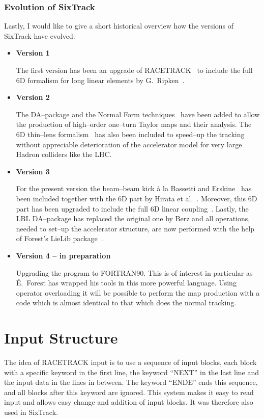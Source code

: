 \documentclass[a4paper,11pt]{report}
\begin{document}
\subsection{Evolution of SixTrack}
Lastly, I would like to give a short historical overview how the versions of SixTrack have evolved.
\begin{itemize}
\item {\bf Version 1}

  The first version has been an upgrade of RACETRACK~\cite{RACETRACK}
  to include the full 6D formalism for long linear elements by
  G.~Ripken~\cite{Ripken85}.
\item {\bf Version 2}

  The DA--package and the Normal Form
  techniques~\cite{Berz89,Forest89} have been added to allow the
  production of high--order one--turn Taylor maps and their
  analysis. The 6D thin--lens formalism~\cite{Ripken95} has also been
  included to speed--up the tracking without appreciable deterioration
  of the accelerator model for very large Hadron colliders like the
  LHC.
\item {\bf Version 3}
  
  For the present version the beam--beam kick \`a la Bassetti and
  Erskine~\cite{BasErs} has been included together with the 6D part by
  Hirata et al.~\cite{Hirata}. Moreover, this 6D part has been
  upgraded to include the full 6D linear coupling~\cite{ripbeam}.
  Lastly, the LBL DA--package has replaced the original one by Berz
  and all operations, needed to set--up the accelerator structure, are
  now performed with the help of Forest's LieLib package~\cite{DALIE}.
\item {\bf Version 4 -- in preparation}
  
  Upgrading the program to FORTRAN90. This is of interest in
  particular as \'E.~Forest has wrapped his tools in this more
  powerful language. Using operator overloading it will be possible to
  perform the map production with a code which is almost identical to
  that which does the normal tracking.
\end{itemize}


\chapter{Input Structure} \label{InpStr}

The idea of RACETRACK input is to use a sequence of input blocks, each
block with a specific keyword in the first line, the keyword ``NEXT''
in the last line and the input data in the lines in between. The
keyword ``ENDE'' ends this sequence, and all blocks after this keyword
are ignored. This system makes it easy to read input and allows easy
change and addition of input blocks. It was therefore also used in
SixTrack\@.
\end{document}
